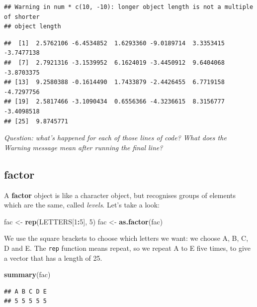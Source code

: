 \documentclass[
]{book}
\newenvironment{Shaded}{\begin{snugshade}}{\end{snugshade}}
\newcommand{\DecValTok}[1]{\textcolor[rgb]{0.00,0.00,0.81}{#1}}
\newcommand{\KeywordTok}[1]{\textcolor[rgb]{0.13,0.29,0.53}{\textbf{#1}}}
\newcommand{\NormalTok}[1]{#1}
\newcommand{\OperatorTok}[1]{\textcolor[rgb]{0.81,0.36,0.00}{\textbf{#1}}}
\newcommand{\StringTok}[1]{\textcolor[rgb]{0.31,0.60,0.02}{#1}}
\begin{document}
\begin{verbatim}
## Warning in num * c(10, -10): longer object length is not a multiple of shorter
## object length
\end{verbatim}

\begin{verbatim}
##  [1]  2.5762106 -6.4534852  1.6293360 -9.0189714  3.3353415 -3.7477138
##  [7]  2.7921316 -3.1539952  6.1624019 -3.4450912  9.6404068 -3.8703375
## [13]  9.2580388 -0.1614490  1.7433879 -2.4426455  6.7719158 -4.7297756
## [19]  2.5817466 -3.1090434  0.6556366 -4.3236615  8.3156777 -3.4098518
## [25]  9.8745771
\end{verbatim}

\emph{Question: what's happened for each of those lines of code? What does the Warning
message mean after running the final line?}\\
\hspace*{0.333em}

\hypertarget{factor}{%
\subsection{factor}\label{factor}}

A \textbf{factor} object is like a character object, but recognises groups of elements
which are the same, called \emph{levels}. Let's take a look:

\begin{Shaded}
\begin{Highlighting}[]
\NormalTok{fac <-}\StringTok{ }\KeywordTok{rep}\NormalTok{(LETTERS[}\DecValTok{1}\OperatorTok{:}\DecValTok{5}\NormalTok{], }\DecValTok{5}\NormalTok{)}
\NormalTok{fac <-}\StringTok{ }\KeywordTok{as.factor}\NormalTok{(fac)}
\end{Highlighting}
\end{Shaded}

We use the square brackets to choose which letters we
want: we choose A, B, C, D and E. The \texttt{rep} function means repeat, so we
repeat A to E five times, to give a vector that has a length of 25.

\begin{Shaded}
\begin{Highlighting}[]
\KeywordTok{summary}\NormalTok{(fac)}
\end{Highlighting}
\end{Shaded}

\begin{verbatim}
## A B C D E 
## 5 5 5 5 5
\end{verbatim}
\end{document}
